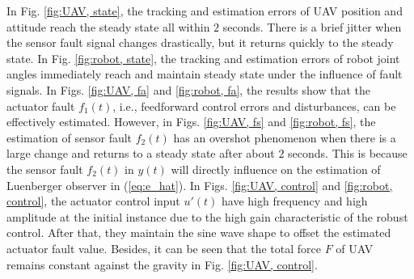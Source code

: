 \documentclass[journal,12pt,onecolumn,draftclsnofoot,]{IEEEtran}
\begin{document}
In Fig. \ref{fig:UAV, state}, the tracking and estimation errors of UAV position and attitude reach the steady state all within $2$ seconds. There is a brief jitter when the sensor fault signal changes drastically, but it returns quickly to the steady state. In Fig. \ref{fig:robot, state}, the tracking and estimation errors of robot joint angles immediately reach and maintain steady state under the influence of fault signals. In Figs. \ref{fig:UAV, fa} and \ref{fig:robot, fa}, the results show that the actuator fault $f_1(t)$, i.e., feedforward control errors and disturbances, can be effectively estimated. However, in Figs. \ref{fig:UAV, fs} and \ref{fig:robot, fs}, the estimation of sensor fault $f_2(t)$ has an overshot phenomenon when there is a large change and returns to a steady state after about $2$ seconds. This is because the sensor fault $f_2(t)$ in $y(t)$ will directly influence on the estimation of Luenberger observer in (\ref{eq:e_hat}). In Figs. \ref{fig:UAV, control} and \ref{fig:robot, control}, the actuator control input $u'(t)$ have high frequency and high amplitude at the initial instance due to the high gain characteristic of the robust control. After that, they maintain the sine wave shape to offset the estimated actuator fault value. Besides, it can be seen that the total force $F$ of UAV remains constant against the gravity in Fig. \ref{fig:UAV, control}.
\end{document}
